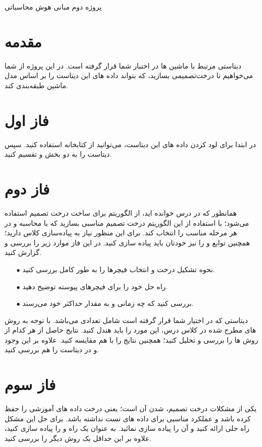 \documentclass{article}
\begin{document}
	\begin{centering}
		\LARGE
		پروژه دوم مبانی هوش محاسباتی \\
	\end{centering}
	\section*{مقدمه}
	دیتاستی مرتبط با ماشین ها در اختبار شما قرار گرفته است. در این پروژه از شما   می‌خواهیم تا درخت‌تصمیمی بسازید، که بتواند داده های این دیتاست را بر اساس مدل ماشین طبقه‌بندی کند.
	\\

	
	\section{فاز اول}
	 در ابتدا برای لود کردن داده های این دیتاست، می‌توانید از کتابخانه  استفاده کنید. سپس دیتاست را به دو بخش  و  تقسیم کنید.
	\section {فاز دوم}
	همانطور که در درس خوانده اید، از الگوریتم  برای ساخت درخت تصمیم استفاده می‌شود؛ با استفاده از این الگوریتم درخت تصمیم مناسبی بسازید که با محاسبه  و  در هر مرحله  مناسب را انتخاب کند. برای این منظور نیاز به پیاده‌سازی کلاس  دارید؛ همچنین توابع   و  را نیز خودتان باید پیاده سازی کنید. در این فاز موارد زیر را بررسی و گزارش کنید.
	\begin{itemize}
		\item [$\bullet$] نحوه تشکیل درخت و انتخاب فیچرها را به طور کامل بررسی کنید.
		\item [$\bullet$] راه حل خود را برای فیچرهای پیوسته توضیح دهید.
		\item [$\bullet$] بررسی کنید که چه زمانی  و  به مقدار حداکثر خود می‌رسند.
	\end{itemize}
	دیتاستی که در اختیار شما قرار گرفته است شامل تعدادی  می‌باشد. با توجه به روش های مطرح شده در کلاس درس، این مورد را باید هندل کنید. نتایج حاصل از هر کدام از روش ها را بررسی و تحلیل کنید؛ همچنین نتایج را با هم مقایسه کنید. علاوه بر این وجود  و  در دیتاست را هم بررسی کنید. 
	\section{فاز سوم}
		یکی از مشکلات درخت تصمیم،  شدن آن است؛ یعنی درخت داده های آموزشی را حفظ کرده باشد و عملکرد مناسبی برای داده های تست نداشته باشد. برای حل این مشکل راه حلی ارائه کنید و آن را پیاده سازی نمائید. به عنوان یک راه  و  را پیاده سازی کنید، علاوه بر این حداقل یک روش دیگر را بررسی کنید.
\end{document}
